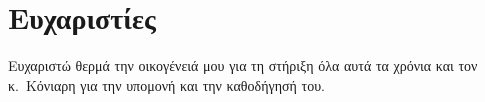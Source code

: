 \chapter*{Ευχαριστίες}
Ευχαριστώ θερμά την οικογένειά μου για τη στήριξη όλα αυτά τα χρόνια και τον
κ.~Κόνιαρη για την υπομονή και την καθοδήγησή του.
\clearpage
